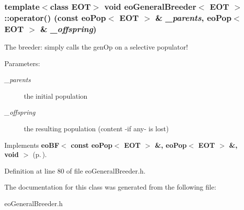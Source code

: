 \subsubsection{\setlength{\rightskip}{0pt plus 5cm}template$<$class EOT$>$ void {\bf eo\-General\-Breeder}$<$ {\bf EOT} $>$::operator() (const {\bf eo\-Pop}$<$ {\bf EOT} $>$ \& {\em \_\-parents}, {\bf eo\-Pop}$<$ {\bf EOT} $>$ \& {\em \_\-offspring})\hspace{0.3cm}{\tt  [inline, virtual]}}\label{classeo_general_breeder_a2}


The breeder: simply calls the gen\-Op on a selective populator! 

\begin{Desc}
\item[Parameters:]
\begin{description}
\item[{\em \_\-parents}]the initial population \item[{\em \_\-offspring}]the resulting population (content -if any- is lost) \end{description}
\end{Desc}


Implements {\bf eo\-BF$<$ const eo\-Pop$<$ EOT $>$ \&, eo\-Pop$<$ EOT $>$ \&, void $>$} {\rm (p.\,\pageref{classeo_b_f_a1})}.

Definition at line 80 of file eo\-General\-Breeder.h.

The documentation for this class was generated from the following file:\begin{CompactItemize}
\item 
eo\-General\-Breeder.h\end{CompactItemize}
